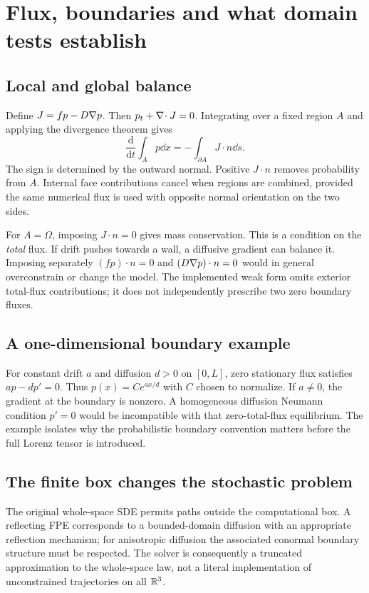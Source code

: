 \chapter{Flux, boundaries and what domain tests establish}\label{ch:flux}
\section{Local and global balance}
Define $J=fp-D\nabla p$. Then $p_t+\nabla\!\cdot J=0$. Integrating over a fixed region $A$ and applying the divergence theorem gives
\begin{equation}\label{eq:balance}
\frac{\mathrm d}{\mathrm dt}\int_Ap\dd x=-\int_{\partial A}J\cdot n\dd s.
\end{equation}
The sign is determined by the outward normal. Positive $J\cdot n$ removes probability from $A$. Internal face contributions cancel when regions are combined, provided the same numerical flux is used with opposite normal orientation on the two sides.

For $A=\Omega$, imposing $J\cdot n=0$ gives mass conservation. This is a condition on the \emph{total} flux. If drift pushes towards a wall, a diffusive gradient can balance it. Imposing separately $(fp)\cdot n=0$ and $(D\nabla p)\cdot n=0$ would in general overconstrain or change the model. The implemented weak form omits exterior total-flux contributions; it does not independently prescribe two zero boundary fluxes.

\section{A one-dimensional boundary example}
For constant drift $a$ and diffusion $d>0$ on $[0,L]$, zero stationary flux satisfies $ap-dp'=0$. Thus $p(x)=Ce^{ax/d}$ with $C$ chosen to normalize. If $a\ne0$, the gradient at the boundary is nonzero. A homogeneous diffusion Neumann condition $p'=0$ would be incompatible with that zero-total-flux equilibrium. The example isolates why the probabilistic boundary convention matters before the full Lorenz tensor is introduced.

\section{The finite box changes the stochastic problem}
The original whole-space SDE permits paths outside the computational box. A reflecting FPE corresponds to a bounded-domain diffusion with an appropriate reflection mechanism; for anisotropic diffusion the associated conormal boundary structure must be respected. The solver is consequently a truncated approximation to the whole-space law, not a literal implementation of unconstrained trajectories on all $\mathbb R^3$.

